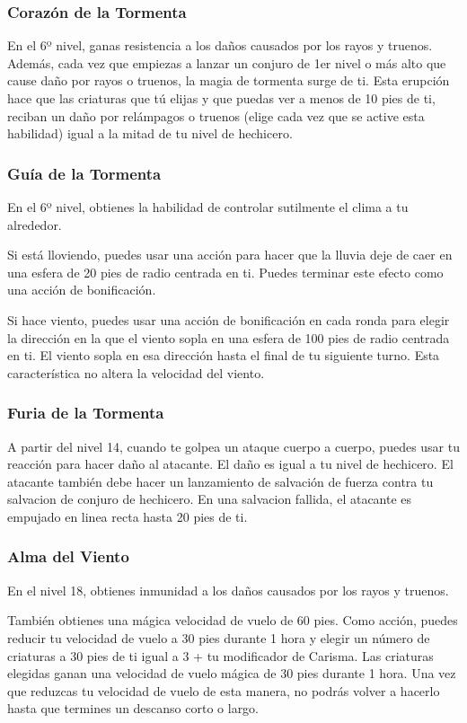 \documentclass[a4paper,twocolumn,openany,10pt]{dndbook}
\begin{document}
\subsubsection{Corazón de la Tormenta}
En el 6º nivel, ganas resistencia a los daños causados por los rayos y truenos. Además, cada vez que empiezas a lanzar un
conjuro de 1er nivel o más alto que cause daño por rayos o truenos, la magia de tormenta surge de ti. Esta erupción hace que
las criaturas que tú elijas y que puedas ver a menos de 10 pies de ti, reciban un daño por relámpagos o truenos (elige cada vez
que se active esta habilidad) igual a la mitad de tu nivel de hechicero.

\subsubsection{Guía de la Tormenta}
En el 6º nivel, obtienes la habilidad de controlar sutilmente el clima a tu alrededor.

Si está lloviendo, puedes usar una acción para hacer que la lluvia deje de caer en una esfera de 20 pies de radio centrada en
ti. Puedes terminar este efecto como una acción de bonificación.

Si hace viento, puedes usar una acción de bonificación en cada ronda para elegir la dirección en la que el viento sopla en una
esfera de 100 pies de radio centrada en ti. El viento sopla en esa dirección hasta el final de tu siguiente turno. Esta
característica no altera la velocidad del viento.

\subsubsection{Furia de la Tormenta}
A partir del nivel 14, cuando te golpea un ataque cuerpo a cuerpo, puedes usar tu reacción para hacer daño al atacante. El daño
es igual a tu nivel de hechicero. El atacante también debe hacer un lanzamiento de salvación de fuerza contra tu salvacion de 
conjuro de hechicero. En una salvacion fallida, el atacante es empujado en linea recta hasta 20 pies de ti. 

\subsubsection{Alma del Viento}
En el nivel 18, obtienes inmunidad a los daños causados por los rayos y truenos.

También obtienes una mágica velocidad de vuelo de 60 pies. Como acción, puedes reducir tu velocidad de vuelo a 30 pies durante
1 hora y elegir un número de criaturas a 30 pies de ti igual a 3 + tu modificador de Carisma. Las criaturas elegidas ganan una
velocidad de vuelo mágica de 30 pies durante 1 hora. Una vez que reduzcas tu velocidad de vuelo de esta manera, no podrás volver
a hacerlo hasta que termines un descanso corto o largo.
\end{document}
